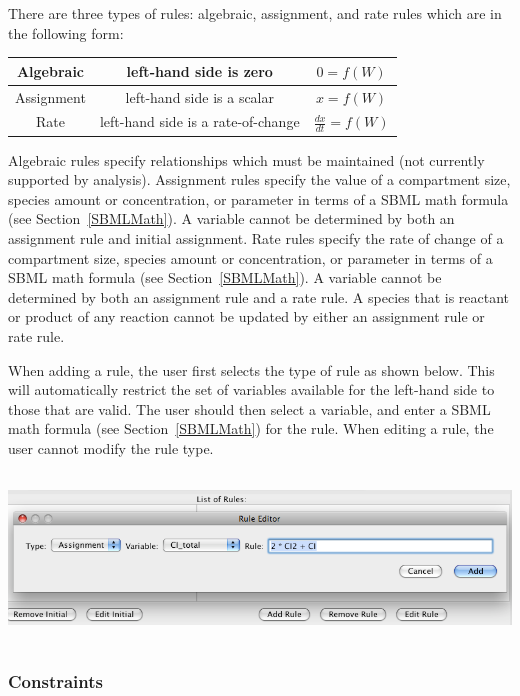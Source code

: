 \documentclass[titlepage,11pt]{article}
\begin{document}
\noindent
There are three types of rules: algebraic, assignment, and rate rules
which are in the following form:
\begin{center}
\begin{tabular}{|c|c|c|}
\hline
Algebraic  & left-hand side is zero             & $0 = f(W)$ \\ \hline
Assignment & left-hand side is a scalar         & $x = f(W)$ \\ \hline
Rate       & left-hand side is a rate-of-change & $\frac{dx}{dt} = f(W)$ 
\\ \hline
\end{tabular}
\end{center}
Algebraic rules specify relationships which must be maintained 
(not currently supported by analysis).  Assignment rules specify 
the value of a compartment size, species amount or concentration, or
parameter in terms of a SBML math formula (see
Section~\ref{SBMLMath}).  A variable cannot be determined by
both an assignment rule and initial assignment.  Rate rules specify
the rate of change of a compartment size, species amount or
concentration, or parameter in terms of a SBML math formula
(see Section~\ref{SBMLMath}).  A variable cannot be determined 
by both an assignment rule and a rate rule.  A species that is 
reactant or product of any reaction cannot be updated by either
an assignment rule or rate rule.

When adding a rule, the user first selects the type of rule as shown
below.  This
will automatically restrict the set of variables available for the 
left-hand side to those that are valid.  The user should then select
a variable, and enter a SBML math formula (see Section~\ref{SBMLMath})
for the rule.  When editing a rule, the user cannot modify the rule type. 
\begin{center}
\includegraphics[height=45mm]{screenshots/rule}
\end{center}

\subsubsection{\label{constraints}Constraints}
\end{document}
